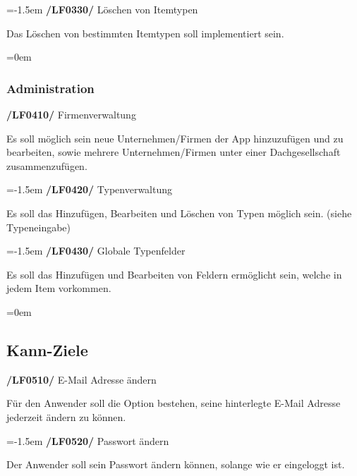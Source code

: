 \documentclass[11pt,a4paper]{report}
\begin{document}
\leftskip=-1.5em
\textbf{/LF0330/} Löschen von Itemtypen
\par
\begingroup
\leftskip=1cm
\noindent Das Löschen von bestimmten Itemtypen soll implementiert sein.\\
\par
\endgroup

\leftskip=0em
\subsubsection{Administration}

\textbf{/LF0410/} Firmenverwaltung
\par
\begingroup
\leftskip=1cm
\noindent Es soll möglich sein neue Unternehmen/Firmen der App hinzuzufügen und zu bearbeiten, sowie mehrere Unternehmen/Firmen unter einer Dachgesellschaft zusammenzufügen.\\
\par
\endgroup

\leftskip=-1.5em
\textbf{/LF0420/} Typenverwaltung
\par
\begingroup
\leftskip=1cm
\noindent Es soll das Hinzufügen, Bearbeiten und Löschen von Typen möglich sein. (siehe Typeneingabe)\\
\par
\endgroup

\leftskip=-1.5em
\textbf{/LF0430/} Globale Typenfelder
\par
\begingroup
\leftskip=1cm
\noindent Es soll das Hinzufügen und Bearbeiten von Feldern ermöglicht sein, welche in jedem Item vorkommen.\\
\par
\endgroup

\leftskip=0em
\subsection{Kann-Ziele}

\textbf{/LF0510/} E-Mail Adresse ändern
\par
\begingroup
\leftskip=1cm
\noindent Für den Anwender soll die Option bestehen, seine hinterlegte E-Mail Adresse jederzeit ändern zu können.\\
\par
\endgroup

\leftskip=-1.5em
\textbf{/LF0520/} Passwort ändern
\par
\begingroup
\leftskip=1cm
\noindent Der Anwender soll sein Passwort ändern können, solange wie er eingeloggt ist.\\
\par
\endgroup
\end{document}
